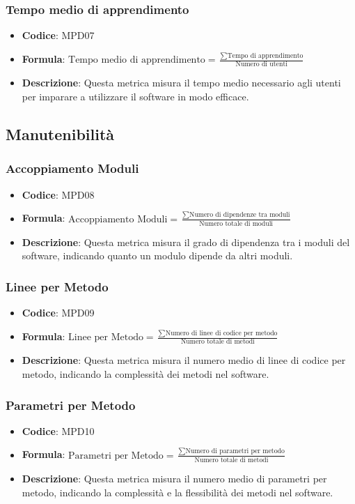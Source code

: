 \documentclass[a4paper, 11pt]{article}
\begin{document}
\subsubsection{Tempo medio di apprendimento}
\begin{itemize}
    \item \textbf{Codice}: MPD07
    \item \textbf{Formula}: $\displaystyle \text{Tempo medio di apprendimento} = \frac{\sum \text{Tempo di apprendimento}}{\text{Numero di utenti}}$
    \item \textbf{Descrizione}: Questa metrica misura il tempo medio necessario agli utenti per imparare a utilizzare il software in modo efficace.
\end{itemize}

\subsection{Manutenibilità}
\subsubsection{Accoppiamento Moduli}
\begin{itemize}
    \item \textbf{Codice}: MPD08
    \item \textbf{Formula}: $\displaystyle \text{Accoppiamento Moduli} = \frac{\sum \text{Numero di dipendenze tra moduli}}{\text{Numero totale di moduli}}$
    \item \textbf{Descrizione}: Questa metrica misura il grado di dipendenza tra i moduli del software, indicando quanto un modulo dipende da altri moduli.
\end{itemize}
\subsubsection{Linee per Metodo}
\begin{itemize}
    \item \textbf{Codice}: MPD09
    \item \textbf{Formula}: $\displaystyle \text{Linee per Metodo} = \frac{\sum \text{Numero di linee di codice per metodo}}{\text{Numero totale di metodi}}$
    \item \textbf{Descrizione}: Questa metrica misura il numero medio di linee di codice per metodo, indicando la   complessità dei metodi nel software.
\end{itemize}
\subsubsection{Parametri per Metodo}
\begin{itemize}
    \item \textbf{Codice}: MPD10
    \item \textbf{Formula}: $\displaystyle \text{Parametri per Metodo} = \frac{\sum \text{Numero di parametri per metodo}}{\text{Numero totale di metodi}}$
    \item \textbf{Descrizione}: Questa metrica misura il numero medio di parametri per metodo, indicando la complessità e la flessibilità dei metodi nel software.
\end{itemize}
\end{document}
